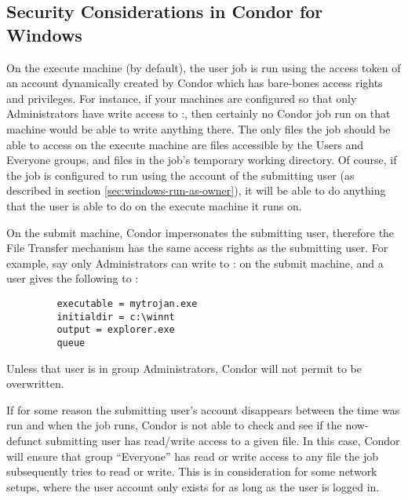\subsection{Security Considerations in Condor for Windows}


On the execute machine (by default), the user job is run using the
access token of an account dynamically created by Condor which has
bare-bones access rights and privileges.  For instance, if your
machines are configured so that only Administrators have write access
to
\verb@C:\WINNT@, then certainly no Condor job run on that machine
would be able to write anything there.  The only files the job should
be able to access on the execute machine are files accessible by the
Users and Everyone groups, and files in the job's temporary working
directory.  Of course, if the job is configured to run using the
account of the submitting user (as described in section
\ref{sec:windows-run-as-owner}), it will be able to do anything that
the user is able to do on the execute machine it runs on.

On the submit machine, Condor impersonates the submitting user, therefore
the File Transfer mechanism has the same access rights as the submitting
user.  For example, say only Administrators can write to
\verb@C:\WINNT@
on the submit machine,
and a user gives the following to  :
\begin{verbatim}
         executable = mytrojan.exe
         initialdir = c:\winnt
         output = explorer.exe
         queue
\end{verbatim}
Unless that user is in group Administrators, Condor will not permit
 to be overwritten.  

If for some reason the submitting user's account disappears between the time
 was run and when the job runs, Condor is not able to check
and see if the now-defunct submitting user has read/write access to a given
file.  In this case, Condor will ensure that group ``Everyone'' has read or
write access to any file the job subsequently tries to read or write.  This
is in consideration for some network setups, where the user account only
exists for as long as the user is logged in.

